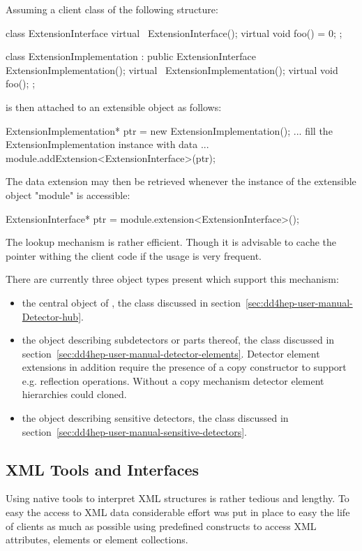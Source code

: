 \documentclass[10pt,a4paper]{article}
\begin{document}
Assuming a client class of the following structure:
\begin{code}
    class ExtensionInterface {
      virtual ~ExtensionInterface();
      virtual void foo() = 0;
    };

    class ExtensionImplementation : public ExtensionInterface {
      ExtensionImplementation();
      virtual ~ExtensionImplementation();
      virtual void foo();
    };
\end{code}
is then attached to an extensible object as follows:
\begin{code}
    ExtensionImplementation* ptr = new ExtensionImplementation();
    ... fill the ExtensionImplementation instance with data ...
    module.addExtension<ExtensionInterface>(ptr);
\end{code}
The data extension may then be retrieved whenever the instance of the
extensible object "module" is accessible:
\begin{code}
    ExtensionInterface* ptr = module.extension<ExtensionInterface>();
\end{code}
The lookup mechanism is rather efficient. Though it is advisable to
cache the pointer withing the client code if the usage is very frequent.


\noindent
There are currently three object types present which support this mechanism:
\begin{itemize}\itemcompact
\item the central object of \DDhep, the  class discussed in 
        section~\ref{sec:dd4hep-user-manual-Detector-hub}.
\item the object describing subdetectors or parts thereof, the 
         class discussed in 
        section~\ref{sec:dd4hep-user-manual-detector-elements}.
        Detector element extensions in addition require the presence 
        of a copy constructor to support e.g. reflection operations.
        Without a copy mechanism detector element hierarchies could 
        cloned.
\item the object describing sensitive detectors, 
       the  class discussed in 
       section~\ref{sec:dd4hep-user-manual-sensitive-detectors}.
\end{itemize}


\newpage
\subsection{XML Tools and Interfaces}
\label{sec:dd4hep-user-manual-xml-tools}
\noindent
Using native tools to interpret XML structures is rather tedious and lengthy.
To easy the access to XML data considerable effort was put in place to easy
the life of clients as much as possible using predefined constructs to 
access XML attributes, elements or element collections.
\end{document}
